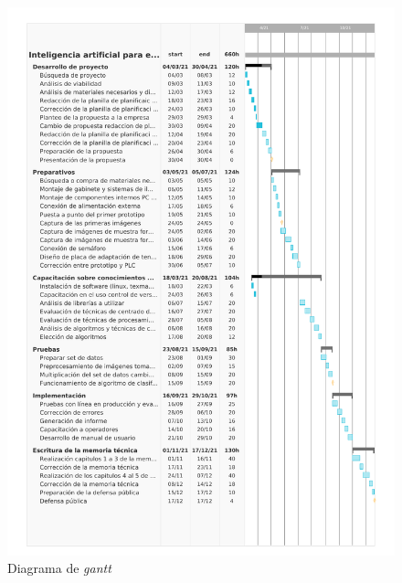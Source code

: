 \documentclass[11pt]{charter}
\begin{document}
\begin{figure}[ht]
\centering 
\includegraphics[origin=c,width=\textwidth]{./Figuras/Gantt7.pdf} %
\caption{Diagrama de \textit{gantt }}
\label{fig:gantt}
\end{figure}





\end{document}
